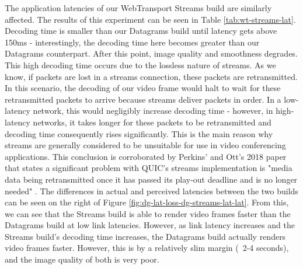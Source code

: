 The application latencies of our WebTransport Streams build are similarly affected. The results of this experiment can be seen in Table \ref{tab:wt-streams-lat}. Decoding time is smaller than our Datagrams build until latency gets above 150ms - interestingly, the decoding time here becomes greater than our Datagrams counterpart. After this point, image quality and smoothness degrades. This high decoding time occurs due to the lossless nature of streams. As we know, if packets are lost in a streams connection, these packets are retransmitted. In this scenario, the decoding of our video frame would halt to wait for these retransmitted packets to arrive because streams deliver packets in order. In a low-latency network, this would negligibly increase decoding time - however, in high-latency networks, it takes longer for these packets to be retransmitted and decoding time consequently rises significantly. This is the main reason why streams are generally considered to be unsuitable for use in video conferencing applications. This conclusion is corroborated by Perkins' and Ott's 2018 paper that states a significant problem with QUIC's streams implementation is "media data being retransmitted once it has passed its play-out
deadline and is no longer needed" \cite{perkins2018}. 
The differences in actual and perceived latencies between the two builds can be seen on the right of Figure \ref{fig:dg-lat-loss-dg-streams-lat-lat}. From this, we can see that the Streams build is able to render video frames faster than the Datagrams build at low link latencies. However, as link latency increases and the Streams build's decoding time increases, the Datagrams build actually renders video frames faster. However, this is by a relatively slim margin (~2-4 seconds), and the image quality of both is very poor. 


